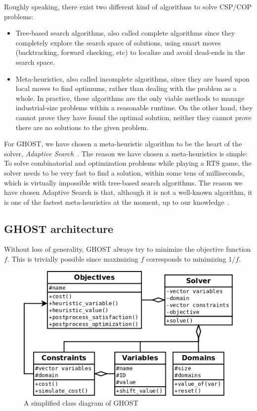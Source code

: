 \documentclass[journal]{IEEEtran}
\newcommand{\csp}{\textsc{CSP}\xspace}
\newcommand{\cop}{\textsc{COP}\xspace}
\newcommand{\ghost}{\textsc{GHOST}\xspace}
\begin{document}
Roughly  speaking, there  exist two  different kind  of algorithms  to
solve \csp/\cop problems: 
\begin{itemize}
\item Tree-based  search algorithms,  also called  complete algorithms
  since they completely  explore the search space  of solutions, using
  smart moves  (backtracking, forward  checking, etc) to  localize and
  avoid dead-ends in the search space.
\item Meta-heuristics,  also called incomplete algorithms,  since they
  are based  upon local  moves to find  optimums, rather  than dealing
  with the problem  as a whole. In practice, these  algorithms are the
  only  viable methods  to  manage industrial-size  problems within  a
  reasonable runtime. On  the other hand, they cannot  prove they have
  found the optimal  solution, neither they cannot prove  there are no
  solutions to the given problem.
\end{itemize}

For \ghost, we have chosen a  meta-heuristic algorithm to be the heart
of the solver, {\it  Adaptive Search}~\cite{Codognet01}. The reason we
have chosen  a meta-heuristics is  simple: To solve  combinatorial and
optimization problems while playing a RTS game, the solver needs to be
very fast to find a solution,  within some tens of milliseconds, which
is virtually impossible with  tree-based search algorithms. The reason
we  have  chosen  Adaptive  Search  is that,  although  it  is  not  a
well-known algorithm, it is one  of the fastest meta-heuristics at the
moment, up to our knowledge~\cite{Caniou14}.


\subsection{\ghost architecture}

Without  loss  of  generality,  \ghost  always  try  to  minimize  the
objective function  $f$. This  is trivially possible  since maximizing
$f$ corresponds to minimizing $1 / f$.

\begin{figure}
  \centering
  \includegraphics[width=\columnwidth]{figs/ghost.png}
  \caption{A simplified class diagram of \ghost}
  \label{fig:ghost}
\end{figure}
\end{document}
